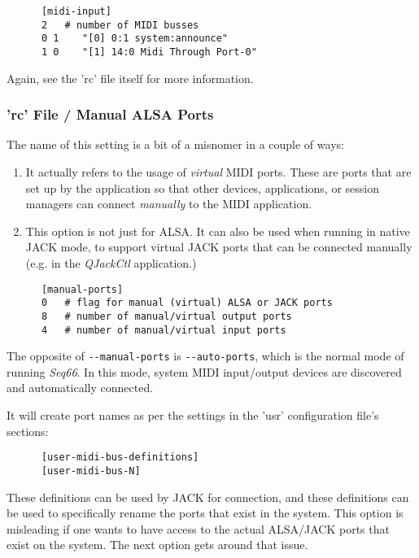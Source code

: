    \begin{verbatim}
      [midi-input]
      2   # number of MIDI busses
      0 1    "[0] 0:1 system:announce"
      1 0    "[1] 14:0 Midi Through Port-0"
   \end{verbatim}

   Again, see the 'rc' file itself for more information.

\subsubsection{'rc' File / Manual ALSA Ports}
\label{subsubsec:configuration_rc_manual_ports}

   The name of this setting is a bit of a misnomer in a couple of ways:

   \begin{enumerate}
      \item It actually refers to the usage of \textsl{virtual} MIDI ports.
         These are ports that are set up by the application so that other
         devices, applications, or session managers can connect
         \textsl{manually} to the MIDI application.
      \item This option is not just for ALSA.  It can also be used when
         running in native JACK mode, to support
         virtual JACK ports that can be connected manually (e.g. in the
         \textsl{QJackCtl} application.)
   \end{enumerate}

   \begin{verbatim}
      [manual-ports]
      0   # flag for manual (virtual) ALSA or JACK ports
      8   # number of manual/virtual output ports
      4   # number of manual/virtual input ports
   \end{verbatim}

   The opposite of \texttt{-{}-manual-ports} is \texttt{-{}-auto-ports},
   which is the normal mode of running \textsl{Seq66}.
   In this mode, system MIDI input/output devices are discovered and
   automatically connected.

   It will create port names as per the settings in the 'usr' configuration
   file's sections:

   \begin{verbatim}
      [user-midi-bus-definitions]
      [user-midi-bus-N]
   \end{verbatim}

   These definitions can be used by JACK for connection, and these
   definitions can be used to specifically rename the ports that exist in the
   system.
   This option is misleading if one wants to have access to the
   actual ALSA/JACK ports that exist on the system.
   The next option gets around that issue.

